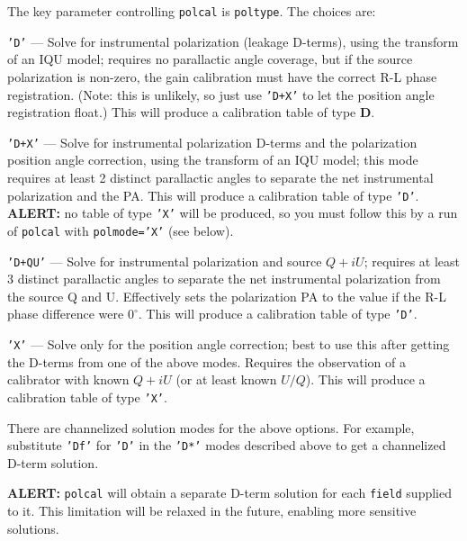 The key parameter controlling {\tt polcal} is {\tt poltype}.  The
choices are:
\begin{description}
\item{\tt 'D'} --- Solve for instrumental polarization (leakage D-terms),
using the transform of an IQU model; requires no
parallactic angle coverage, but if the source polarization is non-zero,
the gain calibration must have the correct R-L phase registration.
(Note: this is unlikely, so just use {\tt 'D+X'} to let the position
angle registration float.) This will produce a calibration table of
type {\bf D}.

\item{\tt 'D+X'} --- Solve for instrumental polarization D-terms and
the polarization position angle correction, using the transform of an
IQU model; this mode requires at least 2 distinct
parallactic angles to separate the net instrumental polarization and
the PA. This will produce a calibration table of
type {\tt 'D'}. {\bf ALERT:} no table of type {\tt 'X'} will be
produced, so you must follow this by a run of {\tt polcal} with
{\tt polmode='X'} (see below).

\item{\tt 'D+QU'} --- Solve for instrumental polarization and source 
$Q+iU$; requires at least 3 distinct parallactic angles to separate
the net instrumental polarization from the source Q and U.
Effectively sets the polarization PA to the value if the R-L phase
difference were $0^\circ$.  This will produce a calibration table of
type {\tt 'D'}. 

\item{\tt 'X'} --- Solve only for the position angle correction; best to use
this after getting the D-terms from one of the above modes.  Requires
the observation of a calibrator with known $Q+iU$ (or at least known $U/Q$).
This will produce a calibration table of type {\tt 'X'}. 

\end{description}

There are channelized solution modes for the above options.  For
example, substitute {\tt 'Df'} for {\tt 'D'} in the {\tt 'D*'} modes 
described above to get a channelized D-term solution.  

{\bf ALERT:} {\tt polcal} will obtain a separate D-term solution for
each {\tt field} supplied to it.  This limitation will be relaxed in 
the future, enabling more sensitive solutions.


